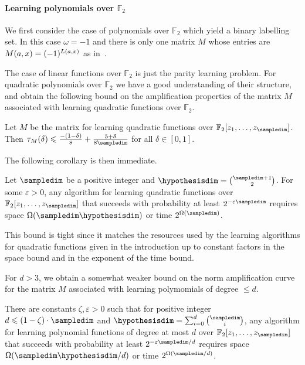 \paragraph{Learning polynomials over $\mathbb{F}_2$}

We first consider the case of polynomials over $\mathbb{F}_2$ which yield 
a binary labelling set.
In this case $\omega=-1$ and there is only one matrix $M$ whose entries
are $M(a,x)=(-1)^{L(a,x)}$ as in~\cite{DBLP:conf/focs/Raz17}.

The case of linear functions over $\mathbb{F}_2$ is just the parity learning
problem.  For quadratic polynomials over $\mathbb{F}_2$
we have a good understanding of their structure, and
obtain the following bound on the amplification properties of the matrix $M$
associated with learning quadratic functions over $\mathbb{F}_2$.

\begin{theorem}
\label{thm:quadcurve}
Let $M$ be the matrix for learning quadratic functions over
$\mathbb{F}_2[z_1,\ldots, z_\sampledim]$.
Then $\tau_M(\delta)\le \frac{-(1-\delta)}8+\frac{5+\delta}{8\sampledim}$ for all 
$\delta\in [0,1]$.
\end{theorem}

The following corollary is then immediate.

\begin{corollary}
\label{cor:quadratic}
Let $\sampledim$ be a positive integer and $\hypothesisdim=\binom{\sampledim+1}2$. For some $\varepsilon>0$,
any algorithm for learning quadratic functions over
$\mathbb{F}_2[z_1,\ldots, z_\sampledim]$ that succeeds with probability at least
$2^{-\varepsilon \sampledim}$ requires space $\Omega(\sampledim\hypothesisdim)$ or time $2^{\Omega(\sampledim)}$.
\end{corollary}

This bound is tight since it matches the resources used by the learning
algorithms for quadratic functions given in the introduction up to constant
factors in the space bound and in the exponent of the time bound.

For $d>3$, we obtain a somewhat weaker bound on the norm amplification curve
for the matrix $M$ associated with learning polymomials of degree $\le d$.

\begin{theorem}
\label{thm:smalld}
There are constants $\zeta,\varepsilon >0$ such that for positive integer
$d\le (1-\zeta) \cdot \sampledim$ and $\hypothesisdim=\sum_{i=0}^d \binom{\sampledim}i$,
any algorithm for learning polynomial functions of degree at most $d$ over
$\mathbb{F}_2[z_1,\ldots, z_\sampledim]$ that succeeds with probability at least
$2^{-\varepsilon \sampledim/d}$ requires space $\Omega(\sampledim\hypothesisdim/d)$ or
time $2^{\Omega(\sampledim/d)}$.
\end{theorem}

